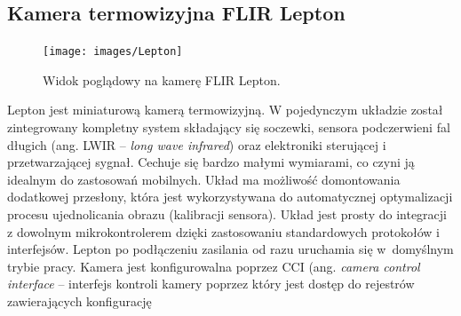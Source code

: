 
\subsection{Kamera termowizyjna FLIR Lepton}
\begin{figure}[h]
    \centering
    \texttt{[image: images/Lepton]}
    \caption{Widok poglądowy na kamerę FLIR Lepton.}
    \label{fig:lepton}
\end{figure}
 
Lepton jest miniaturową kamerą termowizyjną. W pojedynczym układzie został zintegrowany kompletny system składający się soczewki, sensora podczerwieni fal długich (ang. LWIR -- \textit{long wave infrared}) oraz elektroniki sterującej i przetwarzającej sygnał.
Cechuje się bardzo małymi wymiarami, co czyni ją idealnym do zastosowań mobilnych. 
Układ ma możliwość domontowania dodatkowej przesłony, która jest wykorzystywana do automatycznej optymalizacji procesu ujednolicania obrazu (kalibracji sensora).
Układ jest prosty do integracji z dowolnym mikrokontrolerem dzięki zastosowaniu standardowych protokołów i interfejsów. %
Lepton po podłączeniu zasilania od razu uruchamia się w~domyślnym trybie pracy. Kamera jest konfigurowalna poprzez CCI (ang. \textit{camera control interface} – interfejs kontroli kamery poprzez który jest dostęp do rejestrów zawierających konfigurację\cite{lepton} %

